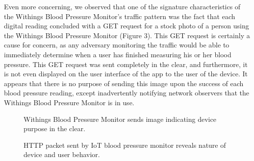 Even more concerning, we observed that one of the signature characteristics of the Withings Blood Pressure Monitor's traffic pattern was the fact that each digital reading concluded with a GET request for a stock photo of a person using the Withings Blood Pressure Monitor (Figure 3). This GET request is certainly a cause for concern, as any adversary monitoring the traffic would be able to immediately determine when a user has finished measuring his or her blood pressure. This GET request was sent completely in the clear, and furthermore, it is not even displayed on the user interface of the app to the user of the device. It appears that there is no purpose of sending this image upon the success of each blood pressure reading, except inadvertently notifying network observers that the Withings Blood Pressure Monitor is in use. 

\begin{figure}
  \centering
     \caption{Withings Blood Pressure Monitor sends image indicating device purpose in the clear.}
     \label{fig:bp-image}
\end{figure}

\begin{figure}
  \centering
  \caption{HTTP packet sent by IoT blood pressure monitor reveals nature of device and user behavior.}
  \label{fig:bp-packet}
\end{figure}

